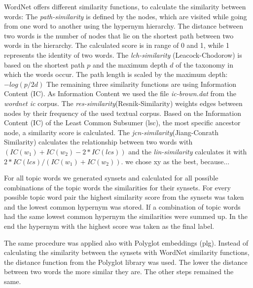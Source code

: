 {%
WordNet offers different similarity functions, to calculate the similarity between words:\newline
The \textit{path-similarity} is defined by the nodes, which are visited while going from one word to another using the hypernym hierarchy. The distance between two words is the number of nodes that lie on the shortest path between two words in the hierarchy. The calculated score is in range of 0 and 1, while 1 represents the identity of two words.\newline
The \textit{lch-similarity} (Leacock-Chodorow) is based on the shortest path $p$ and the maximum depth $d$ of the taxonomy in which the words occur. The path length is scaled by the maximum depth: $-log(p/2d)$\newline
The remaining three similarity functions are using Information Content (IC). As Information Content we used the file \textit{ic-brown.dat} from the \textit{wordnet ic} corpus.\newline
The \textit{res-similarity}(Resnik-Similarity) weights edges between nodes by their frequency of the used textual corpus. Based on the Information Content (IC) of the Least Common Subsumer (lsc), the most specific ancestor node, a similarity score is calculated.\newline
The \textit{jcn-similarity}(Jiang-Conrath Similarity) calculates the relationship between two words with $(IC(w_{1}) + IC(w_{2}) - 2 * IC(lcs))$ and the \textit{lin-similarity} calculates it with $2 * IC(lcs) / (IC(w_{1}) + IC(w_{2}))$.
we chose xy as the best, because... 

For all topic words we generated synsets and calculated for all possible combinations of the topic words the similarities for their synsets. For every possible topic word pair the highest similarity score from the synsets was taken and the lowest common hypernym was stored. If a combination of topic words had the same lowest common hypernym the similarities were summed up. In the end the hypernym with the highest score was taken as the final label. 

The same procedure was applied also with Polyglot embeddings (plg). Instead of calculating the similarity between the synsets with WordNet similarity functions, the distance function from the Polyglot library was used. The lower the distance between two words the more similar they are. The other steps remained the same.


}
